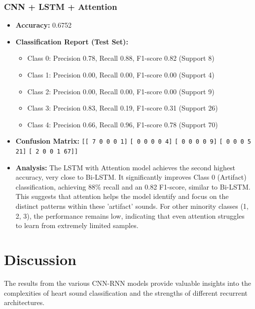 \documentclass[a4paper]{article}
\begin{document}
\begin{multicols}{2}
\subsubsection{CNN + LSTM + Attention}
\begin{itemize}
    \item \textbf{Accuracy:} 0.6752 
    \item \textbf{Classification Report (Test Set):} 
        \begin{itemize}
            \item Class 0: Precision 0.78, Recall 0.88, F1-score 0.82 (Support 8)
            \item Class 1: Precision 0.00, Recall 0.00, F1-score 0.00 (Support 4)
            \item Class 2: Precision 0.00, Recall 0.00, F1-score 0.00 (Support 9)
            \item Class 3: Precision 0.83, Recall 0.19, F1-score 0.31 (Support 26)
            \item Class 4: Precision 0.66, Recall 0.96, F1-score 0.78 (Support 70)
        \end{itemize}
    \item \textbf{Confusion Matrix:} 
        \texttt{[[ 7 0 0 0 1]}
        \texttt{[ 0 0 0 0 4]}
        \texttt{[ 0 0 0 0 9]}
        \texttt{[ 0 0 0 5 21]}
        \texttt{[ 2 0 0 1 67]]}
    \item \textbf{Analysis:} The LSTM with Attention model achieves the second highest accuracy, very close to Bi-LSTM. It significantly improves Class 0 (Artifact) classification, achieving 88\% recall and an 0.82 F1-score, similar to Bi-LSTM. This suggests that attention helps the model identify and focus on the distinct patterns within these 'artifact' sounds. For other minority classes (1, 2, 3), the performance remains low, indicating that even attention struggles to learn from extremely limited samples.

\end{itemize}

\section{Discussion}
The results from the various CNN-RNN models provide valuable insights into the complexities of heart sound classification and the strengths of different recurrent architectures.


\end{multicols}
\end{document}
